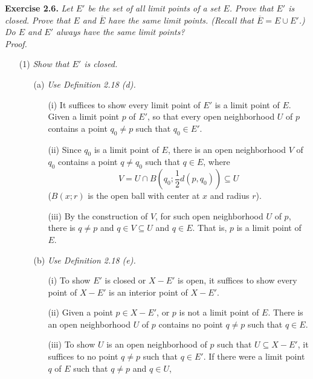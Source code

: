 \documentclass{article}
\begin{document}



\textbf{Exercise 2.6.}
\emph{Let $E'$ be the set of all limit points of a set $E$.
Prove that $E'$ is closed.
Prove that $E$ and $\overline{E}$ have the same limit points.
(Recall that $\overline{E} = E \cup E'$.)
Do $E$ and $E'$ always have the same limit points?} \\

\emph{Proof.}
\begin{enumerate}
\item[(1)]
\emph{Show that $E'$ is closed.}
  \begin{enumerate}
  \item[(a)]
  \emph{Use Definition 2.18 (d).}
    \begin{enumerate}
    \item[(i)]
    It suffices to show every limit point of $E'$ is a limit point of $E$.
    Given a limit point $p$ of $E'$, so that every open neighborhood $U$ of $p$
    contains a point $q_0 \neq p$ such that $q_0 \in E'$.
    \item[(ii)]
    Since $q_0$ is a limit point of $E$,
    there is an open neighborhood $V$ of $q_0$ contains a point $q \neq q_0$
    such that $q \in E$, where
    $$V = U \cap B\left( q_0; \frac{1}{2}d(p,q_0) \right) \subseteq U$$
    ($B(x;r)$ is the open ball with center at $x$ and radius $r$).
    \item[(iii)]
    By the construction of $V$,
    for such open neighborhood $U$ of $p$,
    there is $q \neq p$ and $q \in V \subseteq U$ and $q \in E$.
    That is, $p$ is a limit point of $E$.
    \end{enumerate}
  \item[(b)]
  \emph{Use Definition 2.18 (e).}
    \begin{enumerate}
    \item[(i)]
    To show $E'$ is closed or $X-E'$ is open,
    it suffices to show every point of $X-E'$ is an interior point of $X-E'$.
    \item[(ii)]
    Given a point $p \in X-E'$, or $p$ is not a limit point of $E$.
    There is an open neighborhood $U$ of $p$ contains no point $q \neq p$ such that $q \in E$.
    \item[(iii)]
    To show $U$ is an open neighborhood of $p$ such that $U \subseteq X-E'$,
    it suffices to no point $q \neq p$ such that $q \in E'$.
    If there were a limit point $q$ of $E$ such that $q \neq p$ and $q \in U$,

\end{enumerate}
\end{enumerate}
\end{enumerate}
\end{document}
